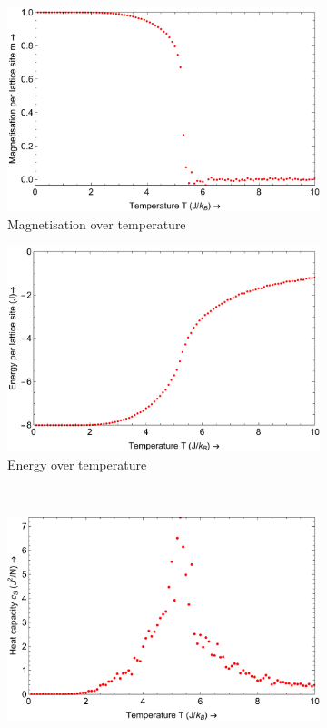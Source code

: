 \documentclass[a4paper]{article}
\begin{document}
\begin{figure}[H]
	\centering
	\begin{subfigure}[b]{0.4\textwidth}
		\centering
		\includegraphics[width=\textwidth]{magplot.pdf}
		\caption{ Magnetisation over temperature}
	\end{subfigure}%
	\begin{subfigure}[b]{0.4\textwidth}
		\centering
		\includegraphics[width=\textwidth]{eplot.pdf}
		\caption{Energy over temperature}
	\end{subfigure}%
	\\
	\begin{subfigure}[b]{0.4\textwidth}   
		\centering
		\includegraphics[width=\textwidth]{hcplot.pdf}

\end{subfigure}
\end{figure}
\end{document}
